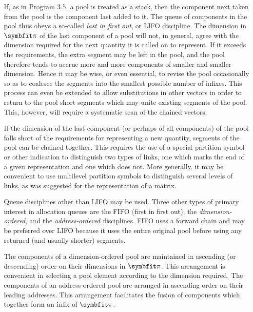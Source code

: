 \par If, as in Program 3.5, a pool is treated as a stack, then the component next taken from the pool is the component last added to it. The queue of components in the pool thus obeys a so-called \textit{last in first out}, or LIFO discipline. The dimension in $\vect{\pi}$ of the last component of a pool will not, in general, agree with the dimension required for the next quantity it is called on to represent. If it exceeds the requirements, the extra segment may be left in the pool, and the pool therefore tends to accrue more and more components of smaller and smaller dimension. Hence it may be wise, or even essential, to revise the pool occasionally so as to coalesce the segments into the smallest possible number of infixes. This process can even be extended to allow substitutions in other vectors in order to return to the pool short segments which may unite existing segments of the pool. This, however, will require a systematic scan of the chained vectors.

\par If the dimension of the last component (or perhaps of all components) of the pool falls short of the requirements for representing a new quantity, segments of the pool can be chained together. This requires the use of a special partition symbol or other indication to distinguish two types of links, one which marks the end of a given representation and one which does not. More generally, it may be convenient to use multilevel partition symbols to distinguish several levels of links, as was suggested for the representation of a matrix.

\par Queue disciplines other than LIFO may be used. Three other types of primary interest in allocation queues are the FIFO (first in first out), the \textit{dimension-ordered}, and the \textit{address-ordered} disciplines. FIFO uses a forward chain and may be preferred over LIFO because it uses the entire original pool before using any returned (and usually shorter) segments.

\par The components of a dimension-ordered pool are maintained in ascending (or descending) order on their dimensions in $\vect{\pi}$. This arrangement is convenient in selecting a pool element according to the dimension required. The components of an address-ordered pool are arranged in ascending order on their leading addresses. This arrangement facilitates the fusion of components which together form an infix of $\vect{\pi}$.

